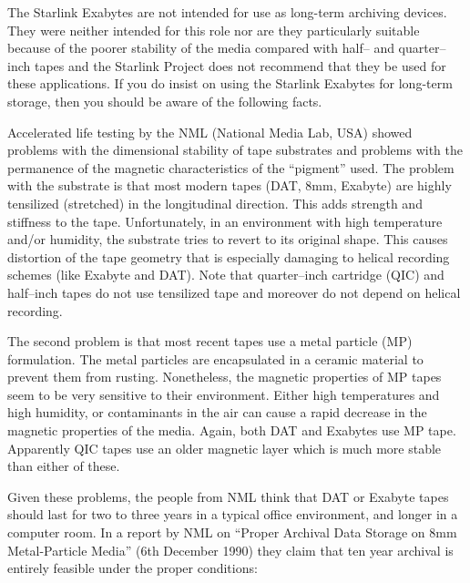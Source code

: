 The Starlink Exabytes are not intended for use as long-term archiving devices.
They were neither intended for this role nor are they particularly suitable
because of the poorer stability of the media compared with half-- and
quarter--inch tapes and the Starlink Project does not recommend that they be
used for these applications. If you do insist on using the Starlink Exabytes
for long-term storage, then you should be aware of the following facts.

Accelerated life testing by the NML (National Media Lab, USA) showed problems
with the dimensional stability of tape substrates and problems with the
permanence of the magnetic characteristics of the ``pigment'' used.  The
problem with the substrate is that most modern tapes (DAT, 8mm, Exabyte) are
highly tensilized (stretched) in the longitudinal direction.  This adds
strength and stiffness to the tape.  Unfortunately, in an environment with high
temperature and/or humidity, the substrate tries to revert to its original
shape.  This causes distortion of the tape geometry that is especially damaging
to helical recording schemes (like Exabyte and DAT). Note that quarter--inch
cartridge (QIC) and half--inch tapes do not use tensilized tape and moreover
do not depend on helical recording.
 
The second problem is that most recent tapes use a metal particle (MP) 
formulation. The metal particles are encapsulated in a ceramic material to
prevent them from rusting.  Nonetheless, the magnetic properties of MP tapes
seem to be very sensitive to their environment.  Either high temperatures and
high humidity, or contaminants in the air can cause a rapid decrease in the
magnetic properties of the media.  Again, both DAT and Exabytes use MP tape. 
Apparently QIC tapes use an older magnetic layer which is much more stable than
either of these.
 
Given these problems, the people from NML think that DAT or Exabyte tapes
should last for two to three years in a typical office environment, and longer
in a computer room.   In a report by NML on ``Proper Archival Data Storage on
8mm Metal-Particle Media'' (6th December 1990) they claim that
ten year archival is entirely feasible under the proper conditions:

